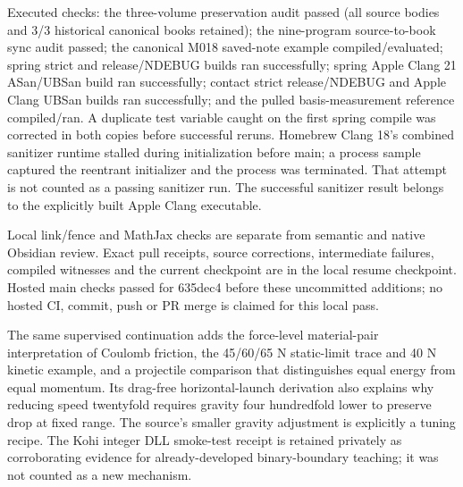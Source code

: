 Executed checks: the three-volume preservation audit passed (all source bodies and 3/3 historical canonical books retained); the nine-program source-to-book sync audit passed; the canonical M018 saved-note example compiled/evaluated; spring strict and release/NDEBUG builds ran successfully; spring Apple Clang 21 ASan/UBSan build ran successfully; contact strict release/NDEBUG and Apple Clang UBSan builds ran successfully; and the pulled basis-measurement reference compiled/ran. A duplicate test variable caught on the first spring compile was corrected in both copies before successful reruns. Homebrew Clang 18's combined sanitizer runtime stalled during initialization before main; a process sample captured the reentrant initializer and the process was terminated. That attempt is not counted as a passing sanitizer run. The successful sanitizer result belongs to the explicitly built Apple Clang executable.

Local link/fence and MathJax checks are separate from semantic and native Obsidian review. Exact pull receipts, source corrections, intermediate failures, compiled witnesses and the current checkpoint are in the local {resume checkpoint}. Hosted main checks passed for 635dec4 before these uncommitted additions; no hosted CI, commit, push or PR merge is claimed for this local pass.

The same supervised continuation adds the force-level material-pair interpretation of Coulomb friction, the 45/60/65 N static-limit trace and 40 N kinetic example, and a projectile comparison that distinguishes equal energy from equal momentum. Its drag-free horizontal-launch derivation also explains why reducing speed twentyfold requires gravity four hundredfold lower to preserve drop at fixed range. The source's smaller gravity adjustment is explicitly a tuning recipe. The Kohi integer DLL smoke-test receipt is retained privately as corroborating evidence for already-developed binary-boundary teaching; it was not counted as a new mechanism.
